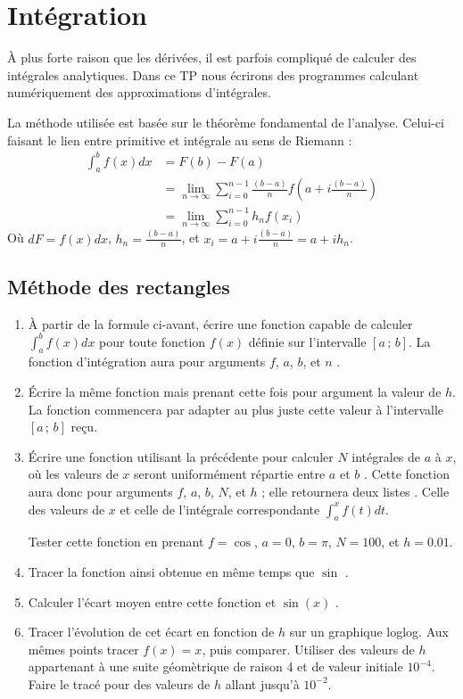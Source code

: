\section{Intégration}
À plus forte raison que les dérivées, il est parfois compliqué de calculer
des intégrales analytiques. Dans ce TP nous écrirons des programmes
calculant numériquement des approximations d'intégrales.

La méthode utilisée est basée sur le théorème fondamental de l'analyse.
Celui-ci faisant le lien entre primitive et intégrale au sens de Riemann :
\begin{equation}
\begin{split}
\int_a^b f(x)dx &= F(b)-F(a) \\
&= \lim_{n\rightarrow\infty} \sum_{i=0}^{n-1}\frac{(b-a)}{n} f(a+i\frac{(b-a)}{n})\\
&= \lim_{n\rightarrow\infty} \sum_{i=0}^{n-1} h_n f(x_i)
\end{split}
\end{equation}
Où $dF = f(x)dx$, $h_n=\frac{(b-a)}{n}$, et $x_i=a+ i\frac{(b-a)}{n} = a+ih_n$.

\subsection{Méthode des rectangles}
\begin{enumerate}
\item À partir de la formule ci-avant, 
écrire une fonction capable de calculer $\int_a^b f(x)dx$
pour toute fonction $f(x)$ définie sur l'intervalle $[a\,;\,b]$. 
La fonction d'intégration aura pour arguments $f$, $a$, $b$, et $n$ .
\item Écrire la même fonction mais prenant cette fois pour argument la 
valeur de $h$. La fonction commencera par adapter au plus juste 
cette valeur à l'intervalle $[a\,;\,b]$ reçu.
\item Écrire une fonction utilisant la précédente
 pour calculer $N$ intégrales de $a$ à $x$, où les valeurs de $x$
seront uniformément répartie entre $a$ et $b$ . 
Cette fonction
aura donc pour arguments $f$, $a$, $b$, $N$, et $h$ ; elle retournera
deux listes . 
Celle des valeurs de $x$ et celle de l'intégrale correspondante
$\int_a^xf(t)dt$.


Tester 
cette fonction 
en prenant $f=\cos$, $a=0$, $b=\pi$, $N=100$, et $h=0.01$. 
\item Tracer la fonction ainsi obtenue en même temps que $\sin$ .
\item Calculer l'écart moyen entre cette fonction et $\sin(x)$ .
\item Tracer l'évolution de cet écart en fonction de $h$ sur un 
graphique loglog. Aux mêmes points tracer $f(x)=x$, puis comparer. Utiliser des 
valeurs de $h$ appartenant à une suite géomètrique de raison 4 et de valeur initiale $10^{-4}$. Faire le tracé pour des valeurs de $h$ allant jusqu'à $10^{-2}$.
\end{enumerate}

